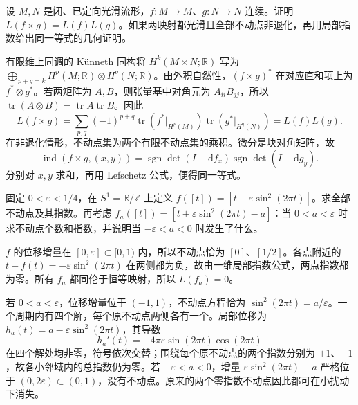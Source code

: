 \begin{exercise}\label{g2:ex:lefschetz-product}
	设 \(M,N\) 是闭、已定向光滑流形，\(f:M\to M\)、\(g:N\to N\) 连续。证明 \(L(f\times g)=L(f)L(g)\)。如果两映射都光滑且全部不动点非退化，再用局部指数给出同一等式的几何证明。
\end{exercise}
\begin{solution}
	有限维上同调的 Künneth 同构将 \(H^k(M\times N;\mathbb R)\) 写为 \(\bigoplus_{p+q=k}H^p(M;\mathbb R)\otimes H^q(N;\mathbb R)\)。由外积自然性，\((f\times g)^*\) 在对应直和项上为 \(f^*\otimes g^*\)。若两矩阵为 \(A,B\)，则张量基中对角元为 \(A_{ii}B_{jj}\)，所以 \(\operatorname{tr}(A\otimes B)=\operatorname{tr}A\operatorname{tr}B\)。因此
	\[
		L(f\times g)=\sum_{p,q}(-1)^{p+q}\operatorname{tr}(f^*|_{H^p(M)})\operatorname{tr}(g^*|_{H^q(N)})=L(f)L(g).
	\]
	在非退化情形，不动点集为两个有限不动点集的乘积。微分是块对角矩阵，故
	\[
		\operatorname{ind}(f\times g,(x,y))
		=\operatorname{sgn}\det(I-\mathrm{d}f_x)\operatorname{sgn}\det(I-\mathrm{d}g_y).
	\]
	分别对 \(x,y\) 求和，再用 Lefschetz 公式，便得同一等式。
\end{solution}

\begin{exercise}\label{g2:ex:degenerate-circle-fixed-indices}
	固定 \(0<\varepsilon<1/4\)，在 \(S^1=\mathbb R/\mathbb Z\) 上定义 \(f([t])=[t+\varepsilon\sin^2(2\pi t)]\)。求全部不动点及其指数。再考虑 \(f_a([t])=[t+\varepsilon\sin^2(2\pi t)-a]\)：当 \(0<a<\varepsilon\) 时求不动点个数和指数，并说明当 \(-\varepsilon<a<0\) 时发生了什么。
\end{exercise}
\begin{solution}
	\(f\) 的位移增量在 \([0,\varepsilon]\subset[0,1)\) 内，所以不动点恰为 \([0]\)、\([1/2]\)。各点附近的 \(t-f(t)=-\varepsilon\sin^2(2\pi t)\) 在两侧都为负，故由一维局部指数公式，两点指数都为零。所有 \(f_a\) 都同伦于恒等映射，所以 \(L(f_a)=0\)。

	若 \(0<a<\varepsilon\)，位移增量位于 \((-1,1)\)，不动点方程恰为 \(\sin^2(2\pi t)=a/\varepsilon\)。一个周期内有四个解，每个原不动点两侧各有一个。局部位移为 \(h_a(t)=a-\varepsilon\sin^2(2\pi t)\)，其导数
	\[
		h_a'(t)=-4\pi\varepsilon\sin(2\pi t)\cos(2\pi t)
	\]
	在四个解处均非零，符号依次交替；围绕每个原不动点的两个指数分别为 \(+1\)、\(-1\)，故各小邻域内的总指数仍为零。若 \(-\varepsilon<a<0\)，增量 \(\varepsilon\sin^2(2\pi t)-a\) 严格位于 \((0,2\varepsilon)\subset(0,1)\)，没有不动点。原来的两个零指数不动点因此都可在小扰动下消失。
\end{solution}

